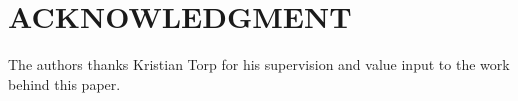 \section*{ACKNOWLEDGMENT}

The authors thanks Kristian Torp for his supervision and value input to the work behind this paper.